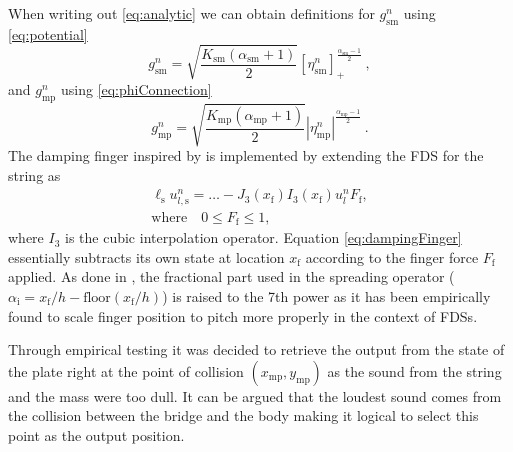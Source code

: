 \documentclass[dvipsnames, pdftex]{article}
\begin{document}
When writing out \eqref{eq:analytic} we can obtain definitions for $g_\text{sm}^n$ using \eqref{eq:potential}
\begin{equation}\label{eq:gnSM}
    g_\text{sm}^n =\sqrt{\frac{K_\text{sm}(\alpha_\text{sm}+1)}{2}}[\eta_\text{sm}^n]_+^{\frac{\alpha_\text{sm}-1}{2}}\ ,
\end{equation}
and $g_\text{mp}^n$ using \eqref{eq:phiConnection}
\begin{equation}\label{eq:gnMP}
    g_\text{mp}^n =\sqrt{\frac{K_\text{mp}(\alpha_\text{mp} + 1)}{2}} |\eta_\text{mp}^n|^{\frac{\alpha_\text{mp} - 1}{2}}\ .
\end{equation}
%
The damping finger inspired by \cite{Willemsen2019:SMC2020} is implemented by extending the FDS for the string as
\begin{gather}\label{eq:dampingFinger}
    \ell_\text{s} u_{l,\text{s}}^n = \hdots - J_3(x_\text{f})I_3(x_\text{f})u^n_lF_\text{f},\\
   \text{where} \quad 0\leq F_\text{f} \leq 1,\nonumber
\end{gather}
where $I_3$ is the cubic interpolation operator. Equation \eqref{eq:dampingFinger} essentially subtracts its own state at location $x_\text{f}$ according to the finger force $F_\text{f}$ applied. As done in \cite{Willemsen2019:SMC2020}, the fractional part used in the spreading operator ($\alpha_\text{i} = x_\text{f}/h - \text{floor}(x_\text{f}/h)$) is raised to the 7th power as it has been empirically found to scale finger position to pitch more properly in the context of FDSs.

Through empirical testing it was decided to retrieve the output from the state of the plate right at the point of collision $(x_\text{mp},y_\text{mp})$ as the sound from the string and the mass were too dull. It can be argued that the loudest sound comes from the collision between the bridge and the body making it logical to select this point as the output position. 
\end{document}
